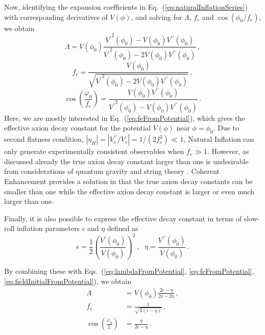 \documentclass[12pt]{article}
\begin{document}
Now, identifying the expansion coefficients in Eq.~(\ref{eq:naturalInflationSeries}) with corresponding derivatives of $V\left(\phi\right)$, and solving for $\Lambda$, $f_e$ and $\cos\left(\phi_0 / f_e\right)$, we obtain
\begin{equation} \label{eq:lambdaFromPotential}
  \Lambda = V\left(\phi_0\right) \frac
    {{V^\prime}^2\left(\phi_0\right) - V\left(\phi_0\right) V^{\prime\prime}\left(\phi_0\right)}
    {{V^\prime}^2\left(\phi_0\right) - 2 V\left(\phi_0\right) V^{\prime\prime}\left(\phi_0\right)}
  \,,
\end{equation}
\begin{equation} \label{eq:feFromPotential}
  f_e = \frac
    {V\left(\phi_0\right)}
    {\sqrt{{V^\prime}^2\left(\phi_0\right)
      - 2 V\left(\phi_0\right) V^{\prime\prime}\left(\phi_0\right)}}\,,
\end{equation}
\begin{equation} \label{eq:fieldInitialFromPotential}
  \cos\left(\frac{\varphi_0}{f_e}\right) = \frac
    {V\left(\phi_0\right) V^{\prime\prime}\left(\phi_0\right)}
    {{V^\prime}^2\left(\phi_0\right) - V\left(\phi_0\right) V^{\prime\prime}\left(\phi_0\right)}\,.
\end{equation}
Here, we are mostly interested in Eq.~(\ref{eq:feFromPotential}), which gives the effective axion decay constant for the potential $V\left(\phi\right)$ near $\phi = \phi_0$.
Due to second flatness condition, $\left|\eta_H\right| = \left|V_e^{\prime\prime} / V_e\right| = 1 / \left(2 f_e^2\right) \ll 1$, Natural Inflation can only generate experimentally consistent observables when $f_e \gg 1$.
However, as discussed already the true axion decay constant larger than one is undesirable from considerations of quantum gravity and string theory \cite{Kallosh:1995hi, Banks:2003sx}.
Coherent Enhancement provides a solution in that the true axion decay constants can be smaller than one while the effective axion decay constant is larger or even much larger than one.

Finally, it is also possible to express the effective decay constant in terms of slow-roll inflation parameters $\epsilon$ and $\eta$ defined as
\begin{equation} \label{eq:epsEtaFromPotential}
  \epsilon = \frac{1}{2} \left(\frac{V^\prime\left(\phi_0\right)}{V\left(\phi_0\right)}\right)^2\,,
  ~~~ \eta = \frac{V^{\prime\prime}\left(\phi_0\right)}{V\left(\phi_0\right)}\,.
\end{equation}

By combining these with Eqs.~(\ref{eq:lambdaFromPotential}, \ref{eq:feFromPotential}, \ref{eq:fieldInitialFromPotential}), we obtain
\begin{align} %
  \label{eq:lambdaSlowRoll}
  \Lambda &= V\left(\phi_0\right) \frac{2 \epsilon - \eta}{2 \epsilon - 2 \eta}\,,\\
  \label{eq:feSlowRoll}
  f_e &= \frac{1}{\sqrt{2 \left(\epsilon - \eta\right)}}\,,\\
  \label{eq:fieldInitialSlowRoll}
  \cos\left(\frac{\varphi_0}{f_e}\right) &= \frac{\eta}{2 \epsilon - \eta}\,.
\end{align}
\end{document}
